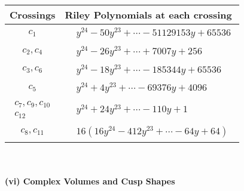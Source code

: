 \documentclass[1p]{elsarticle_modified}
\theoremstyle{definition}
\begin{document}
\begin{tabular}{m{50pt}|m{274pt}}
Crossings & \hspace{64pt}Riley Polynomials at each crossing \\
\hline $$\begin{aligned}c_{1}\end{aligned}$$&$\begin{aligned}
&y^{24}-50 y^{23}+\cdots-51129153 y+65536
\end{aligned}$\\
\hline $$\begin{aligned}c_{2},c_{4}\end{aligned}$$&$\begin{aligned}
&y^{24}-26 y^{23}+\cdots+7007 y+256
\end{aligned}$\\
\hline $$\begin{aligned}c_{3},c_{6}\end{aligned}$$&$\begin{aligned}
&y^{24}-18 y^{23}+\cdots-185344 y+65536
\end{aligned}$\\
\hline $$\begin{aligned}c_{5}\end{aligned}$$&$\begin{aligned}
&y^{24}+4 y^{23}+\cdots-69376 y+4096
\end{aligned}$\\
\hline $$\begin{aligned}c_{7},c_{9},c_{10}\\c_{12}\end{aligned}$$&$\begin{aligned}
&y^{24}+24 y^{23}+\cdots-110 y+1
\end{aligned}$\\
\hline $$\begin{aligned}c_{8},c_{11}\end{aligned}$$&$\begin{aligned}
&16(16 y^{24}-412 y^{23}+\cdots-64 y+64)
\end{aligned}$\\
\hline
\end{tabular}\\~\\
\newpage\flushleft \textbf{(vi) Complex Volumes and Cusp Shapes}
\end{document}
